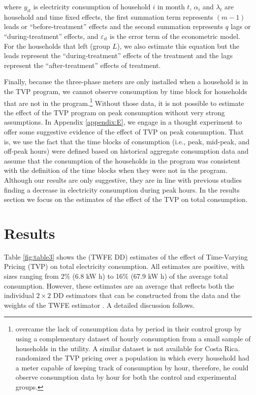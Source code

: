 \documentclass[12pt]{article}
\begin{document}

where $y_{it}$ is electricity consumption of household $i$ in month $t$, $\alpha_{i}$ and $\lambda_{t}$ are household and time fixed effects, the first summation term represents $\left( m-1 \right)$ leads or \enquote{before-treatment} effects and the second summation represents $q$ lags or \enquote{during-treatment} effects, and $\varepsilon_{it}$ is the error term of the econometric model. For the households that left (group $L$), we also estimate this equation but the leads represent the \enquote{during-treatment}  effects of the treatment and the lags represent the \enquote{after-treatment}  effects of treatment.

Finally, because the three-phase meters are only installed when a household is in the TVP program, we cannot observe consumption by time block for households that are not in the program.\footnote{\citet{jessoeUnderstandingRolePrice2014} overcame the lack of consumption data by period in their control group by using a complementary dataset of hourly consumption from a small sample of households in the utility. A similar dataset is not available for Costa Rica. \citet{allcottRethinkingRealtimeElectricity2011} randomized the TVP pricing over a population in which every household had a meter capable of keeping track of consumption by hour, therefore, he could observe consumption data by hour for both the control and experimental groups.} Without those data, it is not possible to estimate the effect of the TVP program on  peak consumption without very strong assumptions. In Appendix \ref{appendix:E}, we engage in a thought experiment to offer some suggestive evidence of the effect of TVP on peak consumption. That is, we use the fact that the time blocks of consumption (i.e., peak, mid-peak, and off-peak hours) were defined based on historical aggregate consumption data and assume that the consumption of the households in the program was consistent with the definition of the time blocks when they were not in the program. Although our results are only suggestive, they are in line with previous studies finding a decrease in electricity consumption during peak hours. In the results section we focus on the estimates of the effect of the TVP on total consumption.

\section{Results}

Table \ref{fig:table3} shows the (TWFE DD) estimates of the effect of Time-Varying Pricing (TVP) on total electricity consumption. All estimates are positive, with sizes ranging from 2\%  (6.8 kW h) to 16\% (67.9 kW h) of the average total consumption. However, these estimates are an average that reflects both the individual $2 \times 2$  DD estimators that can be constructed from the data and the weights of the TWFE estimator \citep{goodman-baconDifferenceinDifferencesVariationTreatment2018}. A detailed discussion follows.
\end{document}
